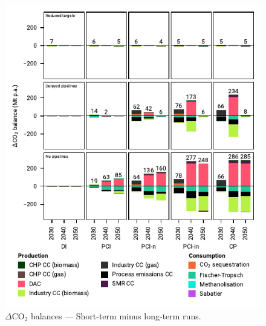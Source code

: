 \documentclass[pdflatex,sn-nature]{sn-jnl}%
\theoremstyle{thmstyleone}%
\theoremstyle{thmstyletwo}%
\theoremstyle{thmstylethree}%
\begin{document}
\begin{appendices}
\begin{figure}[htbp]
  \centering
  \includegraphics{figures/balances_overview_extended_co2 stored}
  \caption{$\Delta$CO$_2$ balances --- Short-term minus long-term runs.}
  \label{fig:balances_overview_extended_co2_stored}
\end{figure}


\end{appendices}
\end{document}
